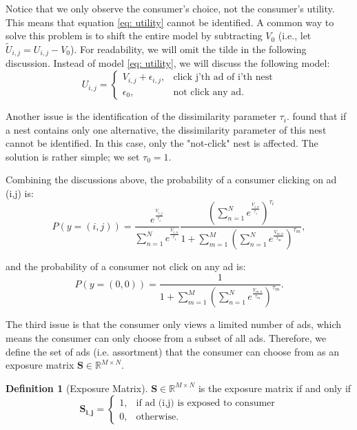 \documentclass[12pt]{article}
\theoremstyle{definition}
\newtheorem{definition}{Definition}[section]
\newcommand{\matr}[1]{\mathbf{#1}} %
\begin{document}
\begin{sloppypar}
Notice that we only observe the consumer's choice, not the consumer's utility. This means that equation \ref{eq: utility} cannot be identified. A common way to solve this problem is to shift the entire model by subtracting $V_0$ (i.e., let $\tilde{U}_{i,j} = U_{i,j} - V_0$).
For readability, we will omit the tilde in the following discussion. Instead of model \ref{eq: utility}, we will discuss the following model:
\begin{equation}\label{eq: utility2}
    U_{i,j} = 
    \begin{cases}
        V_{i,j} + \epsilon_{i,j}, &\text{click j'th ad of i'th nest} \\
        \epsilon_0, &\text{not click any ad}.     
    \end{cases}
\end{equation}

Another issue is the identification of the dissimilarity parameter $\tau_i$. \textcite{heiss} found that if a nest contains only one alternative, the dissimilarity parameter of this nest cannot be identified. In this case, only the "not-click" nest is affected. The solution is rather simple; we set $\tau_0=1$.

Combining the discussions above, the probability of a consumer clicking on ad (i,j) is:
\begin{equation}
    P(y=(i,j)) 
        = \frac{e^\frac{{V_{i,j}}}{\tau_i}}{\sum_{n=1}^{N} e^\frac{{V_{i,n}}}{\tau_i}} \frac{(\sum_{n=1}^{N} e^\frac{{V_{i,n}}}{\tau_i})^{\tau_i}}{1+\sum_{m=1}^{M}(\sum_{n=1}^{N} e^\frac{{V_{m,n}}}{\tau_m})^{\tau_m}},
\end{equation}

and the probability of a consumer not click on any ad is:
\begin{equation}
    P(y=(0,0)) 
        = \frac{1}{1+\sum_{m=1}^{M}(\sum_{n=1}^{N} e^\frac{{V_{m,n}}}{\tau_m})^{\tau_m}}.
\end{equation}

The third issue is that the consumer only views a limited number of ads, which means the consumer can only choose from a subset of all ads. Therefore, we define the set of ads (i.e. assortment) that the consumer can choose from as an exposure matrix $\matr{S} \in \mathbb{R}^{M \times N}$.

\begin{definition}[Exposure Matrix]\label{exposure matrix}
    $\matr{S} \in \mathbb{R}^{M \times N}$ is the exposure matrix if and only if
    \begin{equation*}
        \matr{S_{i,j}} = 
            \begin{cases}
            1, & \text{if ad (i,j) is exposed to consumer} \\
            0, & \text{otherwise}.
            \end{cases}
    \end{equation*}
\end{definition}


\end{sloppypar}
\end{document}
